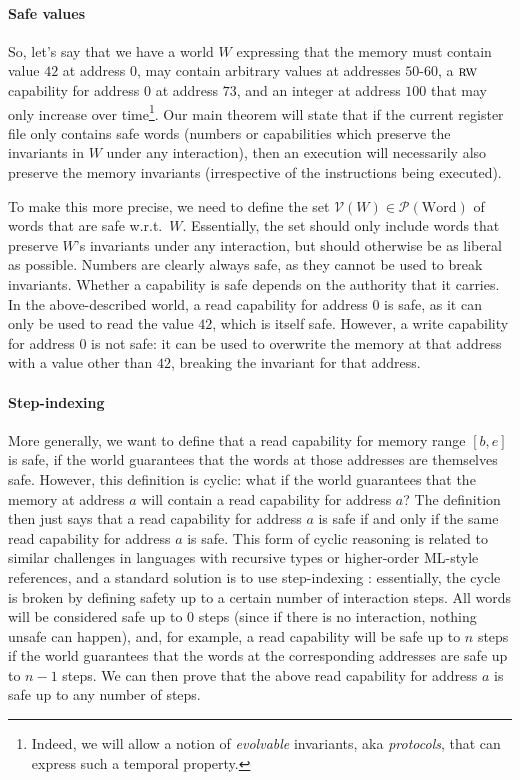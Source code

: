 \documentclass{llncs}
\newcommand{\powerset}[1]{\mathcal{P}(#1)}
\newcommand{\asmType}{\plaindom{AsmType}}
\newcommand{\plaindom}[1]{\mathrm{#1}}
\newcommand{\Words}{\plaindom{Word}}
\newcommand{\intr}[2]{\mathcal{#1}}
\newcommand{\valueintr}[1]{\intr{V}{#1}}
\newcommand{\stdvr}{\valueintr{\asmType}}
\newcommand{\plainperm}[1]{\textsc{#1}}
\newcommand{\readwrite}{\plainperm{rw}}
\begin{document}
\paragraph{Safe values}
So, let's say that we have a world $W$ expressing that the memory must contain
value $42$ at address $0$, may contain arbitrary values at
addresses $50$-$60$, a $\readwrite$ capability for address $0$ at address $73$, and
an integer at address $100$ that may only increase over time\footnote{Indeed, we
  will allow a notion of \emph{evolvable} invariants, aka \emph{protocols}, that can
  express such a temporal property.}. Our main theorem will state that if the
current register file only contains safe words (numbers or capabilities which
preserve the invariants in $W$ under any interaction), then an execution will
necessarily also preserve the memory invariants (irrespective of the instructions being
executed).

To make this more precise, we need to define the set $\stdvr(W) \in
\powerset{\Words}$ of words that are safe w.r.t.\ $W$. Essentially, the set
should only include words that preserve $W$'s invariants under any interaction,
but should otherwise be as liberal as possible. Numbers are clearly always safe,
as they cannot be used to break invariants. Whether a capability is safe depends
on the authority that it carries. In the above-described world, a read capability
for address $0$ is safe, as it can only be used to read the value $42$, which is
itself safe. However, a write capability for address $0$ is not safe: it can be
used to overwrite the memory at that address with a value other than $42$,
breaking the invariant for that address.

\paragraph{Step-indexing}
More generally, we want to define that a read capability for memory range
$[b,e]$ is safe, if the world guarantees that the words at those addresses are
themselves safe. However, this definition is cyclic: what if the world
guarantees that the memory at address $a$ will contain a read capability for
address $a$? The definition then just says that a read capability for address
$a$ is safe if and only if the same read capability for address $a$ is safe. This form of
cyclic reasoning is related to similar challenges in languages with recursive
types or higher-order ML-style references, and a standard solution is
to use step-indexing \cite{Appel:2001:IMR:504709.504712}: essentially, the cycle is broken by defining safety up to a
certain number of interaction steps. All words will be considered
safe up to $0$ steps (since if there is no interaction, nothing unsafe
can happen), and, for example, a read capability will be safe up to $n$
steps if the world guarantees that the words at the corresponding addresses are
safe up to $n - 1$ steps. We can then prove that the above read capability for
address $a$ is safe up to any number of steps.
\end{document}
